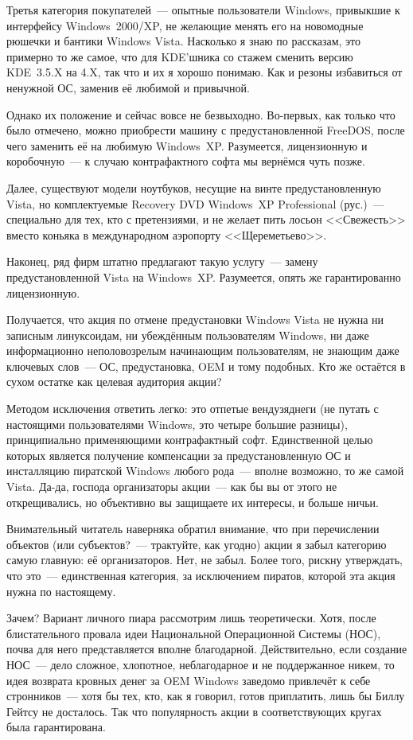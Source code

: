 Третья категория покупателей~--- опытные пользователи Windows, привыкшие к интерфейсу Windows~2000/XP, не желающие менять его на новомодные рюшечки и бантики Windows Vista. Насколько я знаю по рассказам, это примерно то же самое, что для KDE'шника со стажем сменить версию KDE~3.5.X на 4.X, так что и их я хорошо понимаю. Как и резоны избавиться от ненужной ОС, заменив её любимой и привычной.

Однако их положение и сейчас вовсе не безвыходно. Во-первых, как только что было отмечено, можно приобрести машину с предустановленной FreeDOS, после чего заменить её на любимую Windows~XP. Разумеется, лицензионную и коробочную~--- к случаю контрафактного софта мы вернёмся чуть позже.

Далее, существуют модели ноутбуков, несущие на винте предустановленную Vista, но комплектуемые Recovery DVD Windows~XP Professional (рус.)~--- специально для тех, кто с претензиями, и не желает пить лосьон <<Свежесть>> вместо коньяка в международном аэропорту <<Щереметьево>>.

Наконец, ряд фирм штатно предлагают такую услугу~--- замену предустановленной Vista на Windows~XP. Разумеется, опять же гарантированно лицензионную.

Получается, что акция по отмене предустановки Windows Vista не нужна ни записным линуксоидам, ни убеждённым пользователям Windows, ни даже информационно неполовозрелым начинающим пользователям, не знающим даже ключевых слов~--- ОС, предустановка, OEM и тому подобных. Кто же остаётся в сухом остатке как целевая аудитория акции?

Методом исключения ответить легко: это отпетые вендузяднеги (не путать с настоящими пользователями Windows, это четыре большие разницы), принципиально применяющими контрафактный софт. Единственной целью которых является получение компенсации за предустановленную ОС и инсталляцию пиратской Windows любого рода~--- вполне возможно, то же самой Vista. Да-да, господа организаторы акции~--- как бы вы от этого не открещивались, но объективно вы защищаете их интересы, и больше ничьи.

Внимательный читатель наверняка обратил внимание, что при перечислении объектов (или субъектов?~--- трактуйте, как угодно) акции я забыл категорию самую главную: её организаторов. Нет, не забыл. Более того, рискну утверждать, что это~--- единственная категория, за исключением пиратов, которой эта акция нужна по настоящему.

Зачем? Вариант личного пиара рассмотрим лишь теоретически. Хотя, после блистательного провала идеи Национальной Операционной Системы (НОС), почва для него представляется вполне благодарной. Действительно, если создание НОС~--- дело сложное, хлопотное, неблагодарное и не поддержанное никем, то идея возврата кровных денег за OEM Windows заведомо привлечёт к себе стронников~--- хотя бы тех, кто, как я говорил, готов приплатить, лишь бы Биллу Гейтсу не досталось. Так что популярность акции в соответствующих кругах была гарантирована.

